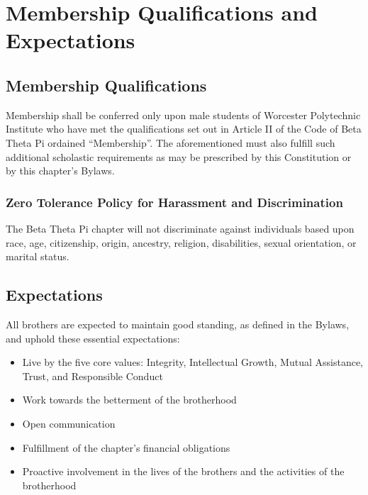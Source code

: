 \chapter{Membership Qualifications and Expectations}
\label{cha:membership-qualifications-and-expectations}

\section{Membership Qualifications}
\label{sec:membership-qualifications}

Membership shall be conferred only upon male students of Worcester Polytechnic
Institute who have met the qualifications set out in Article II of the Code of
Beta Theta Pi ordained ``Membership''.
The aforementioned must also fulfill such additional scholastic requirements as
may be prescribed by this Constitution or by this chapter’s Bylaws.

\subsection{Zero Tolerance Policy for Harassment and Discrimination} 
\label{sec:zero-tolerance-policy-for-harassment-and-discrimination}

The Beta Theta Pi chapter will not discriminate against individuals based upon
race, age, citizenship, origin, ancestry, religion, disabilities, sexual
orientation, or marital status.

\section{Expectations}
\label{sec:expectations}

All brothers are expected to maintain good standing, as defined in the Bylaws,
and uphold these essential expectations:
\begin{itemize}
	\item Live by the five core values: Integrity, Intellectual Growth, Mutual
		Assistance, Trust, and Responsible Conduct
	\item Work towards the betterment of the brotherhood
	\item Open communication
	\item Fulfillment of the chapter's financial obligations
	\item Proactive involvement in the lives of the brothers and the activities
		of the brotherhood
\end{itemize}


